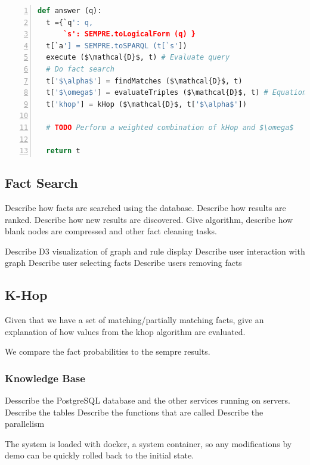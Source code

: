 \begin{lstlisting}[language=Python,basicstyle=\small,showstringspaces=false,mathescape=true,frame=single,numbers=left,label=probqa-algo,caption={Algorithm for obtaining the information}]
def answer (q):
  t ={`q': q,
      `s': SEMPRE.toLogicalForm (q) }
  t[`a'] = SEMPRE.toSPARQL (t[`s'])
  execute ($\mathcal{D}$, t) # Evaluate query
  # Do fact search
  t['$\alpha$'] = findMatches ($\mathcal{D}$, t) 
  t['$\omega$'] = evaluateTriples ($\mathcal{D}$, t) # Equation~\ref{eq:probqa-weight}
  t['khop'] = kHop ($\mathcal{D}$, t['$\alpha$'])

  # TODO Perform a weighted combination of kHop and $\omega$

  return t

\end{lstlisting}



\subsection{Fact Search}
\label{sec:probqa-search}
Describe how facts are searched using the database.
Describe how results are ranked.
Describe how new results are discovered.
Give algorithm, describe how blank nodes are compressed and other fact cleaning tasks.

Describe D3 visualization of graph and rule display
Describe user interaction with graph
Describe user selecting facts
Describe users removing facts


\subsection{K-Hop}
\label{sec:probqa-inference}
Given that we have a set of matching/partially matching facts, give an explanation of how values from the khop algorithm are evaluated.

We compare the fact probabilities to the sempre results.

\subsubsection{Knowledge Base}

Desscribe the PostgreSQL database and the other services running on servers.
Describe the tables 
Describe the functions that are called
Describe the parallelism

The system is loaded with docker, a system container, so any modifications by demo can be quickly rolled back to the initial state.






